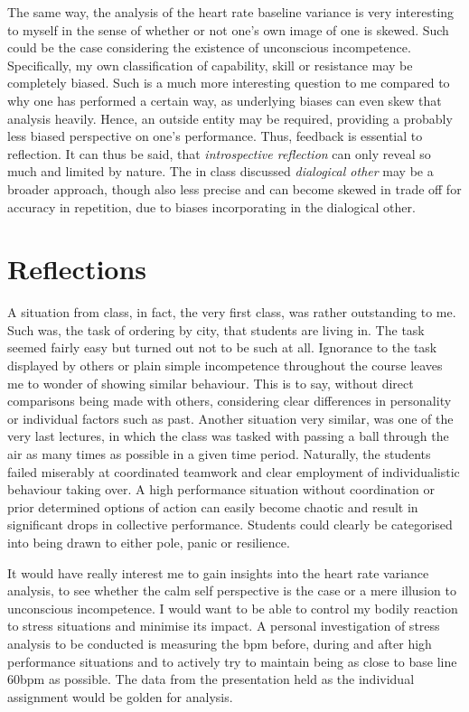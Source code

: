 \documentclass[12pt]{article}
\begin{document}
The same way, the analysis of the heart rate baseline variance is very
interesting to myself in the sense of whether or not one's own image of one is
skewed. Such could be the case considering the existence of unconscious
incompetence. Specifically, my own classification of capability, skill or
resistance may be completely biased. Such is a much more interesting question to
me compared to why one has performed a certain way, as underlying biases can
even skew that analysis heavily. Hence, an outside entity may be required,
providing a probably less biased perspective on one's performance. Thus,
feedback is essential to reflection. It can thus be said, that
\textit{introspective reflection} can only reveal so much and limited by nature.
The in class discussed \textit{dialogical other} may be a broader approach,
though also less precise and can become skewed in trade off for accuracy in
repetition, due to biases incorporating in the dialogical other.

\section{Reflections}

A situation from class, in fact, the very first class, was rather outstanding to
me. Such was, the task of ordering by city, that students are living in. The
task seemed fairly easy but turned out not to be such at all. Ignorance to the
task displayed by others or plain simple incompetence throughout the course
leaves me to wonder of showing similar behaviour. This is to say, without direct
comparisons being made with others, considering clear differences in personality
or individual factors such as past. Another situation very similar, was one of
the very last lectures, in which the class was tasked with passing a ball
through the air as many times as possible in a given time period. Naturally, the
students failed miserably at coordinated teamwork and clear employment of
individualistic behaviour taking over. A high performance situation without
coordination or prior determined options of action can easily become chaotic and
result in significant drops in collective performance. Students could clearly be
categorised into being drawn to either pole, panic or resilience. 

It would have really interest me to gain insights into the heart rate variance
analysis, to see whether the calm self perspective is the case or a mere
illusion to unconscious incompetence. I would want to be able to control my
bodily reaction to stress situations and minimise its impact. A personal
investigation of stress analysis to be conducted is measuring the bpm before,
during and after high performance situations and to actively try to maintain
being as close to base line 60bpm as possible. The data from the presentation
held as the individual assignment would be golden for analysis. 
\end{document}

